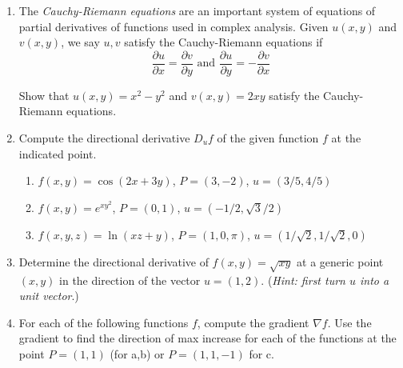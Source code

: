\documentclass[12pt]{article}
\numberwithin{equation}{subsection}
\numberwithin{figure}{subsection}
\theoremstyle{note}
\begin{document}
{\begin{enumerate}[label=\arabic*.]
\begin{enumerate}
	\item $f(x,y)=8x^2y+5xy^3-2x$
	\item $f(x,y)=e^{x}\sin(y)$
	\item $f(x,y)=\dfrac{x+y}{x^2-3y}$
\end{enumerate}

\item The \textit{Cauchy-Riemann equations} are an important system of equations of partial derivatives of functions used in complex analysis. Given $u(x,y)$ and $v(x,y)$, we say $u,v$ satisfy the Cauchy-Riemann equations if 
\begin{equation} \dfrac{\partial u}{\partial x}=\dfrac{\partial v}{\partial y} \text{ and } \dfrac{\partial u}{\partial y}=-\dfrac{\partial v}{\partial x}\end{equation}

Show that $u(x,y)=x^2-y^2$ and $v(x,y)=2xy$ satisfy the Cauchy-Riemann equations. 





\item Compute the directional derivative $D_{u} f$ of the given function $f$ at the indicated point.

\begin{enumerate}
	\item $f(x,y)=\cos(2x+3y)$, $P=(3,-2)$, $u=(3/5,4/5)$
	\item $f(x,y)=e^{xy^2}$, $P=(0,1)$, $u=(-1/2,\sqrt{3}/2)$
	\item $f(x,y,z)=\ln(xz+y)$, $P=(1,0,\pi)$, $u=(1/\sqrt{2}, 1/\sqrt{2},0)$
\end{enumerate}

\item Determine the directional derivative of $f(x,y)=\sqrt{xy}$ at a generic point $(x,y)$ in the direction of the vector $u=(1,2)$. (\textit{Hint: first turn $u$ into a unit vector}.)

\item For each of the following functions $f$, compute the gradient $\nabla f$. Use the gradient to find the direction of max increase for each of the functions at the point $P=(1,1)$ (for a,b) or $P=(1,1,-1)$ for c.


\end{enumerate}}
\end{document}
